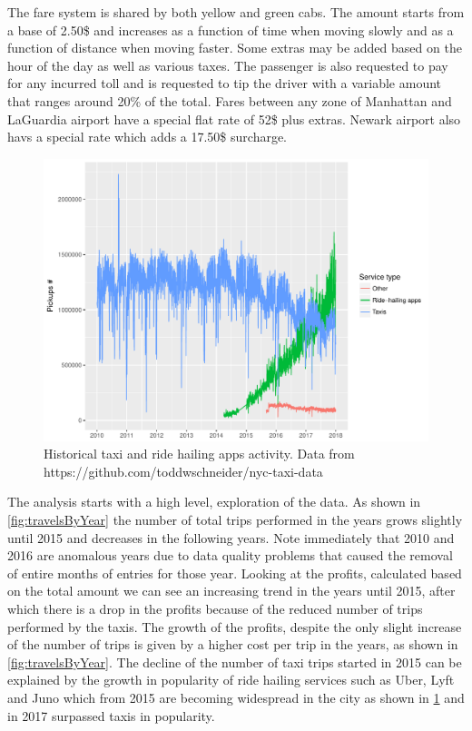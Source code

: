 \documentclass{acm_proc_article-sp-sigmod09}
\begin{document}
The fare system is shared by both yellow and green cabs. The amount starts from a base of 2.50\$ and increases as a function of time when moving slowly and as a function of distance when moving faster. Some extras may be added based on the hour of the day as well as various taxes. The passenger is also requested to pay for any incurred toll and is requested to tip the driver with a variable amount that ranges around 20\% of the total. Fares between any zone of Manhattan and LaGuardia airport have a special flat rate of 52\$ plus extras. Newark airport also havs a special rate which adds a 17.50\$ surcharge.

\begin{figure}
	\centering
	\includegraphics[width=1\columnwidth]{resources/fhv_vs_taxi.pdf}
	\caption{Historical taxi and ride hailing apps activity. Data from https://github.com/toddwschneider/nyc-taxi-data}
	\label{fig:uberVsTaxis}
\end{figure}

The analysis starts with a high level, exploration of the data. As shown in \cref{fig:travelsByYear} the number of total trips performed in the years grows slightly until 2015 and decreases in the following years. Note immediately that 2010 and 2016 are anomalous years due to data quality problems that caused the removal of entire months of entries for those year. Looking at the profits, calculated based on the total amount we can see an increasing trend in the years until 2015, after which there is a drop in the profits because of the reduced number of trips performed by the taxis. The growth of the profits, despite the only slight increase of the number of trips is given by a higher cost per trip in the years, as shown in \cref{fig:travelsByYear}. The decline of the number of taxi trips started in 2015 can be explained by the growth in popularity of ride hailing services such as Uber, Lyft and Juno which from 2015 are becoming widespread in the city as shown in \cref{fig:uberVsTaxis} and in 2017 surpassed taxis in popularity.
\end{document}
